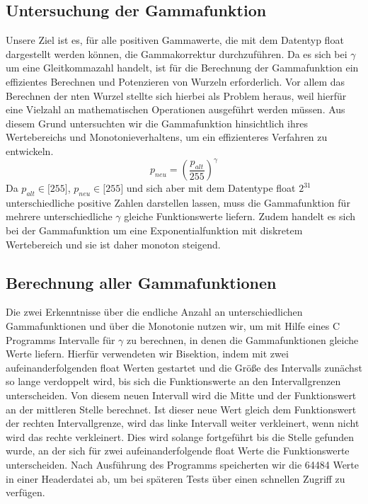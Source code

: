 \documentclass[course=erap]{aspdoc}
\begin{document}
\subsection{Untersuchung der Gammafunktion}
Unsere Ziel ist es, für alle positiven Gammawerte, die mit dem Datentyp float dargestellt werden können, die Gammakorrektur durchzuführen. Da es sich bei $\gamma$ um eine Gleitkommazahl handelt, ist für die Berechnung der Gammafunktion ein effizientes Berechnen und Potenzieren von Wurzeln erforderlich. Vor allem das Berechnen der nten Wurzel stellte sich hierbei als Problem heraus, weil hierfür eine Vielzahl an mathematischen Operationen ausgeführt werden müssen. Aus diesem Grund untersuchten wir die Gammafunktion hinsichtlich ihres Wertebereichs und Monotonieverhaltens, um ein effizienteres Verfahren zu entwickeln.
\begin{equation}
p_{neu} = \left(\frac{p_{alt}}{255}\right)^{\gamma}
\end{equation}   
Da $p_{alt} \in \lbrack255\rbrack$, $p_{neu} \in \lbrack255\rbrack$ und sich aber mit dem Datentype float $2^{31}$ unterschiedliche positive Zahlen darstellen lassen, muss die Gammafunktion für mehrere unterschiedliche $\gamma$ gleiche Funktionswerte liefern. Zudem handelt es sich bei der Gammafunktion um eine Exponentialfunktion mit diskretem Wertebereich und sie ist daher monoton steigend. 
\subsection{Berechnung aller Gammafunktionen}
Die zwei Erkenntnisse über die endliche Anzahl an unterschiedlichen Gammafunktionen und über die Monotonie nutzen wir, um mit Hilfe eines C Programms Intervalle für $\gamma$ zu berechnen, in denen die Gammafunktionen gleiche Werte liefern. Hierfür verwendeten wir Bisektion, indem mit zwei aufeinanderfolgenden float Werten gestartet und die Größe des Intervalls zunächst so lange verdoppelt wird, bis sich die Funktionswerte an den Intervallgrenzen unterscheiden. Von diesem neuen Intervall wird die Mitte und der Funktionswert an der mittleren Stelle berechnet. Ist dieser neue Wert gleich dem Funktionswert der rechten Intervallgrenze, wird das linke Intervall weiter verkleinert, wenn nicht wird das rechte verkleinert. Dies wird solange fortgeführt bis die Stelle gefunden wurde, an der sich für zwei aufeinanderfolgende float Werte die Funktionswerte unterscheiden. Nach Ausführung des Programms speicherten wir die 64484 Werte in einer Headerdatei ab, um bei späteren Tests über einen schnellen Zugriff zu verfügen.         
\end{document}
